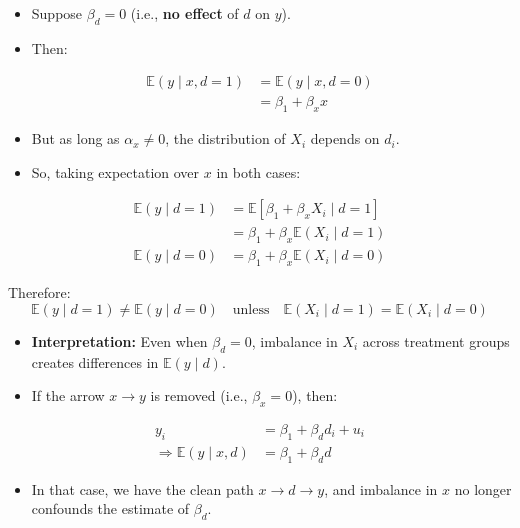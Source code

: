 \documentclass[12pt]{article}
\begin{document}
\begin{itemize}
  \item Suppose $\beta_d = 0$ (i.e., \textbf{no effect} of $d$ on $y$).
  \item Then:
\end{itemize}

\begin{align}
\mathbb{E}(y \mid x, d = 1) &= \mathbb{E}(y \mid x, d = 0) \\
                            &= \beta_1 + \beta_x x
\end{align}

\begin{itemize}
  \item But as long as $\alpha_x \ne 0$, the distribution of $X_i$ depends on $d_i$.
  \item So, taking expectation over $x$ in both cases:
\end{itemize}

\begin{align}
\mathbb{E}(y \mid d = 1) &= \mathbb{E}[\beta_1 + \beta_x X_i \mid d = 1] \\
                         &= \beta_1 + \beta_x \mathbb{E}(X_i \mid d = 1) \\
\mathbb{E}(y \mid d = 0) &= \beta_1 + \beta_x \mathbb{E}(X_i \mid d = 0)
\end{align}

\noindent
Therefore:
\begin{equation}
\mathbb{E}(y \mid d = 1) \ne \mathbb{E}(y \mid d = 0) \quad \text{unless} \quad \mathbb{E}(X_i \mid d = 1) = \mathbb{E}(X_i \mid d = 0)
\end{equation}

\begin{itemize}
  \item \textbf{Interpretation:} Even when $\beta_d = 0$, imbalance in $X_i$ across treatment groups creates differences in $\mathbb{E}(y \mid d)$.
  \item If the arrow $x \rightarrow y$ is removed (i.e., $\beta_x = 0$), then:
\end{itemize}

\begin{align}
y_i &= \beta_1 + \beta_d d_i + u_i \\
\Rightarrow \mathbb{E}(y \mid x, d) &= \beta_1 + \beta_d d
\end{align}

\begin{itemize}
  \item In that case, we have the clean path $x \rightarrow d \rightarrow y$, and imbalance in $x$ no longer confounds the estimate of $\beta_d$.
\end{itemize}
\end{document}
